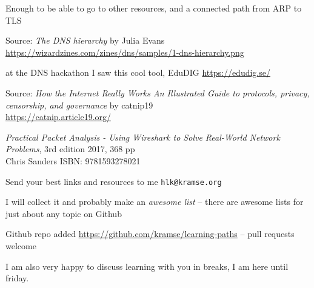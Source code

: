 \documentclass[Screen16to9,17pt]{foils}
\begin{document}
Enough to be able to go to other resources, and a connected path from ARP to TLS





{\small Source: \emph{The DNS hierarchy} by Julia Evans}\\
\url{https://wizardzines.com/zines/dns/samples/1-dns-hierarchy.png} {\color{red}\faHeart}



\begin{list2}
\item at the DNS hackathon I saw this cool tool, EduDIG \url{https://edudig.se/} {\color{red}\faHeart}
\end{list2}



{\small Source: \emph{How the Internet Really Works
An Illustrated Guide to protocols, privacy, censorship, and governance} by catnip19}\\
\url{https://catnip.article19.org/} {\color{red}\faHeart}




\begin{list2}
\item \emph{Practical Packet Analysis - Using Wireshark to Solve Real-World Network Problems}, 3rd edition 2017, 368 pp\\
Chris Sanders ISBN: 9781593278021
\end{list2}


\begin{list2}
\item Send your best links and resources to me \verb+hlk@kramse.org+
\item I will collect it and probably make an \emph{awesome list} -- there are awesome lists for just about any topic on Github
\item Github repo added \url{https://github.com/kramse/learning-paths} -- pull requests welcome
\end{list2}

I am also very happy to discuss learning with you in breaks, I am here until friday.
\end{document}

